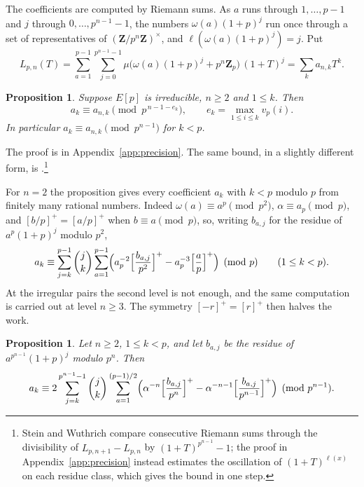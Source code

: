 \documentclass[11pt]{amsart}
\newtheorem{proposition}[theorem]{Proposition}
\theoremstyle{definition}
\newcommand{\Z}{\mathbf{Z}}
\newcommand{\Zp}{\mathbf{Z}_p}
\begin{document}
The coefficients are computed by Riemann sums. As $a$ runs through $1,\dots,p-1$ and $j$ through $0,\dots,p^{n-1}-1$, the numbers $\omega(a)(1+p)^j$ run once through a set of representatives of $(\Z/p^n\Z)^\times$, and $\ell(\omega(a)(1+p)^j)=j$. Put
\begin{equation}\label{eq:riemann}
L_{p,n}(T)=\sum_{a=1}^{p-1}\sum_{j=0}^{p^{n-1}-1}\mu\bigl(\omega(a)(1+p)^j+p^n\Zp\bigr)\,(1+T)^j=\sum_k a_{n,k}T^k .
\end{equation}

\begin{proposition}\label{prop:precision}
Suppose $E[p]$ is irreducible, $n\ge2$ and $1\le k$. Then
\[
a_k\equiv a_{n,k}\pmod{p^{\,n-1-e_k}},\qquad e_k=\max_{1\le i\le k}v_p(i).
\]
In particular $a_k\equiv a_{n,k}\pmod{p^{n-1}}$ for $k<p$.
\end{proposition}

The proof is in Appendix~\ref{app:precision}. The same bound, in a slightly different form, is \cite[Prop.~3.5]{SW13}.\footnote{Stein and Wuthrich compare consecutive Riemann sums through the divisibility of $L_{p,n+1}-L_{p,n}$ by $(1+T)^{p^{n-1}}-1$; the proof in Appendix~\ref{app:precision} instead estimates the oscillation of $(1+T)^{\ell(x)}$ on each residue class, which gives the bound in one step.}

For $n=2$ the proposition gives every coefficient $a_k$ with $k<p$ modulo $p$ from finitely many rational numbers. Indeed $\omega(a)\equiv a^p\pmod{p^2}$, $\alpha\equiv a_p\pmod p$, and $[b/p]^+=[a/p]^+$ when $b\equiv a\pmod p$, so, writing $b_{a,j}$ for the residue of $a^p(1+p)^j$ modulo $p^2$,
\begin{equation}\label{eq:closed}
a_k\equiv\sum_{j=k}^{p-1}\binom{j}{k}\sum_{a=1}^{p-1}\Bigl(a_p^{-2}\Bigl[\frac{b_{a,j}}{p^2}\Bigr]^+-a_p^{-3}\Bigl[\frac{a}{p}\Bigr]^+\Bigr)\pmod p\qquad(1\le k<p).
\end{equation}
At the irregular pairs the second level is not enough, and the same computation is carried out at level $n\ge3$. The symmetry $[-r]^+=[r]^+$ then halves the work.

\begin{proposition}\label{prop:leveln}
Let $n\ge2$, $1\le k<p$, and let $b_{a,j}$ be the residue of $a^{p^{n-1}}(1+p)^j$ modulo $p^n$. Then
\[
a_k\equiv2\sum_{j=k}^{p^{n-1}-1}\binom{j}{k}\sum_{a=1}^{(p-1)/2}\Bigl(\alpha^{-n}\Bigl[\frac{b_{a,j}}{p^n}\Bigr]^+-\alpha^{-n-1}\Bigl[\frac{b_{a,j}}{p^{n-1}}\Bigr]^+\Bigr)\pmod{p^{n-1}} .
\]
\end{proposition}
\end{document}
